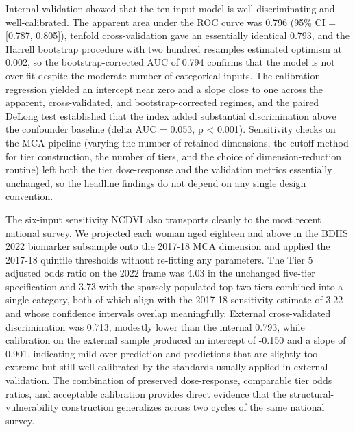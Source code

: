 \documentclass[
  12pt,
  a4paper]{article}
\begin{document}
Internal validation showed that the ten-input model is well-discriminating and well-calibrated. The apparent area under the ROC curve was 0.796 (95\% CI = {[}0.787, 0.805{]}), tenfold cross-validation gave an essentially identical 0.793, and the Harrell bootstrap procedure with two hundred resamples estimated optimism at 0.002, so the bootstrap-corrected AUC of 0.794 confirms that the model is not over-fit despite the moderate number of categorical inputs. The calibration regression yielded an intercept near zero and a slope close to one across the apparent, cross-validated, and bootstrap-corrected regimes, and the paired DeLong test established that the index added substantial discrimination above the confounder baseline (delta AUC = 0.053, p \textless{} 0.001). Sensitivity checks on the MCA pipeline (varying the number of retained dimensions, the cutoff method for tier construction, the number of tiers, and the choice of dimension-reduction routine) left both the tier dose-response and the validation metrics essentially unchanged, so the headline findings do not depend on any single design convention.

The six-input sensitivity NCDVI also transports cleanly to the most recent national survey. We projected each woman aged eighteen and above in the BDHS 2022 biomarker subsample onto the 2017-18 MCA dimension and applied the 2017-18 quintile thresholds without re-fitting any parameters. The Tier 5 adjusted odds ratio on the 2022 frame was 4.03 in the unchanged five-tier specification and 3.73 with the sparsely populated top two tiers combined into a single category, both of which align with the 2017-18 sensitivity estimate of 3.22 and whose confidence intervals overlap meaningfully. External cross-validated discrimination was 0.713, modestly lower than the internal 0.793, while calibration on the external sample produced an intercept of -0.150 and a slope of 0.901, indicating mild over-prediction and predictions that are slightly too extreme but still well-calibrated by the standards usually applied in external validation. The combination of preserved dose-response, comparable tier odds ratios, and acceptable calibration provides direct evidence that the structural-vulnerability construction generalizes across two cycles of the same national survey.
\end{document}
